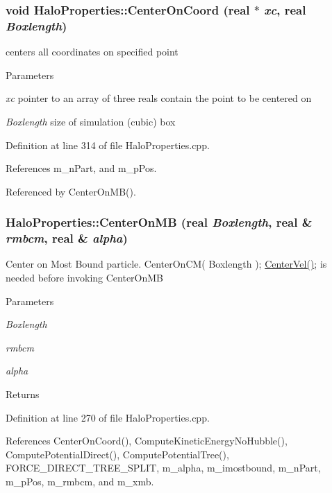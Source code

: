 \subsubsection[{CenterOnCoord}]{\setlength{\rightskip}{0pt plus 5cm}void HaloProperties::CenterOnCoord ({\bf real} $\ast$ {\em xc}, \/  {\bf real} {\em Boxlength})}\label{classHaloProperties_ade9b254c05fdc9b71cb3f93933774157}
centers all coordinates on specified point 
\begin{DoxyParams}{Parameters}
\item[{\em xc}]pointer to an array of three reals contain the point to be centered on \item[{\em Boxlength}]size of simulation (cubic) box \end{DoxyParams}


Definition at line 314 of file HaloProperties.cpp.



References m\_\-nPart, and m\_\-pPos.



Referenced by CenterOnMB().

\subsubsection[{CenterOnMB}]{ HaloProperties::CenterOnMB ({\bf real} {\em Boxlength}, \/  {\bf real} \& {\em rmbcm}, \/  {\bf real} \& {\em alpha})}\label{classHaloProperties_a3234a91e6ce19248e9a5523af439fe25}
Center on Most Bound particle. CenterOnCM( Boxlength ); \hyperlink{classHaloProperties_ab8ca12ff57d1ed55feedb3a287136745}{CenterVel()}; is needed before invoking CenterOnMB 
\begin{DoxyParams}{Parameters}
\item[{\em Boxlength}]\item[{\em rmbcm}]\item[{\em alpha}]\end{DoxyParams}
\begin{DoxyReturn}{Returns}

\end{DoxyReturn}


Definition at line 270 of file HaloProperties.cpp.



References CenterOnCoord(), ComputeKineticEnergyNoHubble(), ComputePotentialDirect(), ComputePotentialTree(), FORCE\_\-DIRECT\_\-TREE\_\-SPLIT, m\_\-alpha, m\_\-imostbound, m\_\-nPart, m\_\-pPos, m\_\-rmbcm, and m\_\-xmb.

